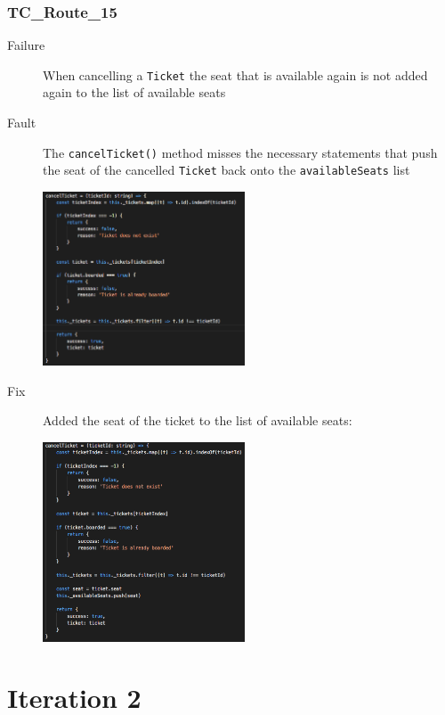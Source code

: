 \documentclass[11pt]{article}
\begin{document}
\subsubsection{TC\_Route\_15}
\label{sec:orgc8e1a36}

\begin{description}
\item[{Failure}] When cancelling a \texttt{Ticket} the seat that is available again is not added again to the list of available seats
\item[{Fault}] The \texttt{cancelTicket()} method misses the necessary statements that push the seat of the cancelled \texttt{Ticket} back onto the \texttt{availableSeats} list
\begin{center}
\includegraphics[width=6cm]{./Iteration2.rtfd/Pasted Graphic 2.tiff.png}
\end{center}
\item[{Fix}] Added the seat of the ticket to the list of available seats:
\begin{center}
\includegraphics[width=6cm]{./Iteration2.rtfd/1_Pasted Graphic 3.tiff.png}
\end{center}
\end{description}

\section{Iteration 2}
\label{sec:orge2f3dff}
\end{document}
